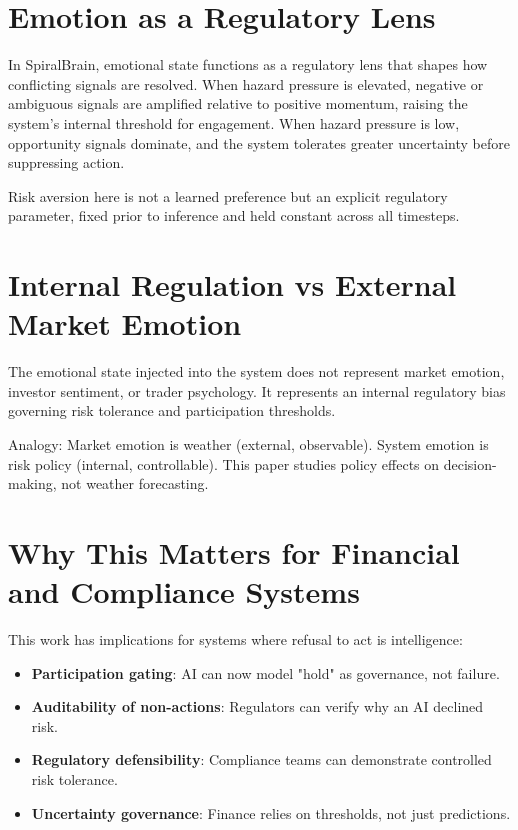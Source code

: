\documentclass[12pt,a4paper]{article}
\begin{document}
\section{Emotion as a Regulatory Lens}

In SpiralBrain, emotional state functions as a regulatory lens that shapes how conflicting signals are resolved. When hazard pressure is elevated, negative or ambiguous signals are amplified relative to positive momentum, raising the system's internal threshold for engagement. When hazard pressure is low, opportunity signals dominate, and the system tolerates greater uncertainty before suppressing action.

Risk aversion here is not a learned preference but an explicit regulatory parameter, fixed prior to inference and held constant across all timesteps.

\section{Internal Regulation vs External Market Emotion}

The emotional state injected into the system does not represent market emotion, investor sentiment, or trader psychology. It represents an internal regulatory bias governing risk tolerance and participation thresholds.

Analogy: Market emotion is weather (external, observable). System emotion is risk policy (internal, controllable). This paper studies policy effects on decision-making, not weather forecasting.

\section{Why This Matters for Financial and Compliance Systems}

This work has implications for systems where refusal to act is intelligence:

\begin{itemize}
	\item \textbf{Participation gating}: AI can now model "hold" as governance, not failure.
	\item \textbf{Auditability of non-actions}: Regulators can verify why an AI declined risk.
	\item \textbf{Regulatory defensibility}: Compliance teams can demonstrate controlled risk tolerance.
	\item \textbf{Uncertainty governance}: Finance relies on thresholds, not just predictions.
\end{itemize}
\end{document}
